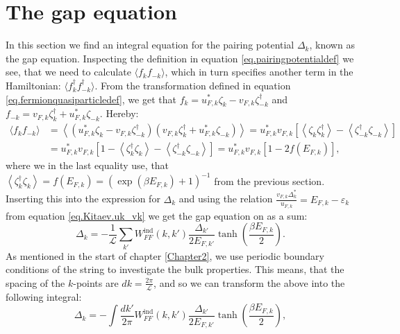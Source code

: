 \section{The gap equation} \label{sec.pairingpotential.integralequation}
In this section we find an integral equation for the pairing potential $\Delta_k$, known as the gap equation. Inspecting the definition in equation \eqref{eq.pairingpotentialdef} we see, that we need to calculate $\langle f_k f_{-k} \rangle$, which in turn specifies another term in the Hamiltonian: $\langle f^\dagger_k f^\dagger_{-k} \rangle$. From the transformation defined in equation \eqref{eq.fermionquasiparticledef}, we get that $f_k = u^*_{F,k}\zeta_k - v_{F,k}\zeta^\dagger_{-k}$ and $f_{-k} = v_{F,k}\zeta^\dagger_k + u^*_{F,k}\zeta_{-k}$. Hereby:
\begin{align}
\langle f_k f_{-k} \rangle &= \left \langle (u^*_{F,k}\zeta_k - v_{F,k}\zeta^\dagger_{-k}) (v_{F,k}\zeta^\dagger_k + u^*_{F,k}\zeta_{-k}) \right \rangle = u^*_{F,k}v_{F,k}\left[ \left \langle \zeta_k \zeta^\dagger_{k} \right \rangle - \left \langle \zeta^\dagger_{-k} \zeta_{-k} \right \rangle \right]  \nonumber \\
& =  u^*_{F,k}v_{F,k}\left[ 1 - \left \langle \zeta^\dagger_{k} \zeta_k \right \rangle - \left \langle \zeta^\dagger_{-k} \zeta_{-k} \right \rangle \right] = u^*_{F,k}v_{F,k}\left[1 - 2f(E_{F,k})\right], \nonumber
\end{align}
where we in the last equality use, that $\left \langle \zeta^\dagger_{k} \zeta_{k} \right \rangle = f(E_{F,k})=(\exp(\beta E_{F,k})+1)^{-1} $ from the previous section. Inserting this into the expression for $\Delta_k$ and using the relation $\frac{v_{F,k}\Delta^*_k}{u_{F,k}}=E_{F,k}-\varepsilon_k$ from equation \eqref{eq.Kitaev.uk_vk} we get the gap equation on as a sum:
\begin{equation}
\Delta_k = - \frac{1}{\mathcal{L}}\sum_{k'} W^\text{ind}_{FF}(k,k')\frac{\Delta_{k'}}{2E_{F,k'}}\tanh\left(\frac{\beta E_{F,k}}{2}\right).
\label{eq.GapequationSum}
\end{equation} 
As mentioned in the start of chapter \ref{Chapter2}, we use periodic boundary conditions of the string to investigate the bulk properties. This means, that the spacing of the $k$-points are $dk = \frac{2\pi}{\mathcal{L}}$, and so we can transform the above into the following integral:
\begin{equation}
\Delta_k = - \int \frac{dk'}{2\pi} W^\text{ind}_{FF}(k,k')\frac{\Delta_{k'}}{2E_{F,k'}}\tanh\left(\frac{\beta E_{F,k}}{2}\right), 
\label{eq.GapequationIntegral}
\end{equation} 
